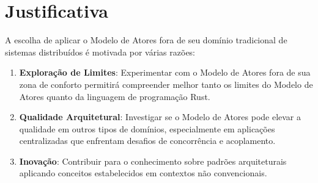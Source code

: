 \section{Justificativa}

A escolha de aplicar o Modelo de Atores fora de seu domínio tradicional de sistemas distribuídos é motivada por várias razões:

\begin{enumerate}
    \item \textbf{Exploração de Limites}: Experimentar com o Modelo de Atores fora de sua zona de conforto permitirá compreender melhor tanto os limites do Modelo de Atores quanto da linguagem de programação Rust.
    
    \item \textbf{Qualidade Arquitetural}: Investigar se o Modelo de Atores pode elevar a qualidade em outros tipos de domínios, especialmente em aplicações centralizadas que enfrentam desafios de concorrência e acoplamento.
    
    \item \textbf{Inovação}: Contribuir para o conhecimento sobre padrões arquiteturais aplicando conceitos estabelecidos em contextos não convencionais.
\end{enumerate}
